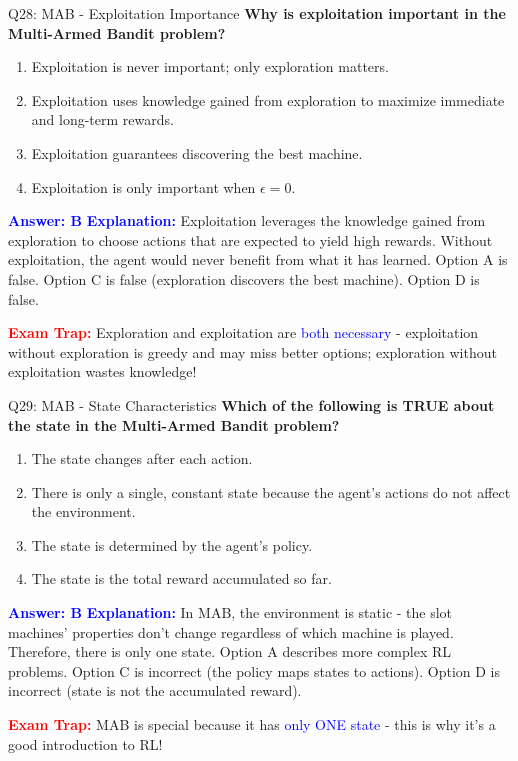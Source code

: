 \documentclass[8pt]{beamer}
\begin{document}
	\begin{frame}{Q28: MAB - Exploitation Importance}
		\fontsize{6.5}{7.5}\selectfont
		\textbf{Why is exploitation important in the Multi-Armed Bandit problem?}
		
		\begin{enumerate}
			\item Exploitation is never important; only exploration matters.
			\item Exploitation uses knowledge gained from exploration to maximize immediate and long-term rewards.
			\item Exploitation guarantees discovering the best machine.
			\item Exploitation is only important when $\epsilon = 0$.
		\end{enumerate}
		
		\vspace{0.1cm}
		\textcolor{blue}{\textbf{Answer: B}}
		\vspace{0.1cm}
		\textcolor{blue}{\textbf{Explanation:}} Exploitation leverages the knowledge gained from exploration to choose actions that are expected to yield high rewards. Without exploitation, the agent would never benefit from what it has learned. Option A is false. Option C is false (exploration discovers the best machine). Option D is false.
		
		\textcolor{red}{\textbf{Exam Trap:}} Exploration and exploitation are \textcolor{blue}{both necessary} - exploitation without exploration is greedy and may miss better options; exploration without exploitation wastes knowledge!
	\end{frame}
	
	\begin{frame}{Q29: MAB - State Characteristics}
		\fontsize{6.5}{7.5}\selectfont
		\textbf{Which of the following is TRUE about the state in the Multi-Armed Bandit problem?}
		
		\begin{enumerate}
			\item The state changes after each action.
			\item There is only a single, constant state because the agent's actions do not affect the environment.
			\item The state is determined by the agent's policy.
			\item The state is the total reward accumulated so far.
		\end{enumerate}
		
		\vspace{0.1cm}
		\textcolor{blue}{\textbf{Answer: B}}
		\vspace{0.1cm}
		\textcolor{blue}{\textbf{Explanation:}} In MAB, the environment is static - the slot machines' properties don't change regardless of which machine is played. Therefore, there is only one state. Option A describes more complex RL problems. Option C is incorrect (the policy maps states to actions). Option D is incorrect (state is not the accumulated reward).
		
		\textcolor{red}{\textbf{Exam Trap:}} MAB is special because it has \textcolor{blue}{only ONE state} - this is why it's a good introduction to RL!
	\end{frame}
	
\end{document}
